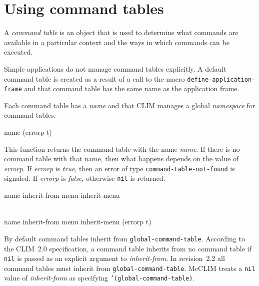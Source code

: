 \chapter{Using command tables}
\label{using-command-tables}

A \emph{command table} is an object that is used to determine what
commands are available in a particular context and the ways in which
commands can be executed.

Simple applications do not manage command tables explicitly.  A
default command table is created as a result of a call to the macro
\texttt{define-application-frame} and that command table has the same
name as the application frame.

Each command table has a \emph{name} and that CLIM manages a global
\emph{namespace} for command tables.

 {name \key (errorp t)}

This function returns the command table with the name \textit{name}.
If there is no command table with that name, then what happens depends
on the value of \textit{errorp}.  If \textit{errorp} is \emph{true},
then an error of type \texttt{command-table-not-found} is signaled. 
If \textit{errorp} is \emph{false}, otherwise \texttt{nil} is
returned.

 {name \key inherit-from menu
  inherit-menu}

 {\\name \key inherit-from menu
  inherit-menu (errorp t)}

By default command tables inherit from
\texttt{global-command-table}. According to the CLIM~2.0
specification, a command table inherits from no command table if
\texttt{nil} is passed as an explicit argument to
\textit{inherit-from}. In revision~2.2 all command tables must inherit
from \texttt{global-command-table}. McCLIM treats a \texttt{nil} value
of \textit{inherit-from} as specifying \texttt{'(global-command-table)}.
